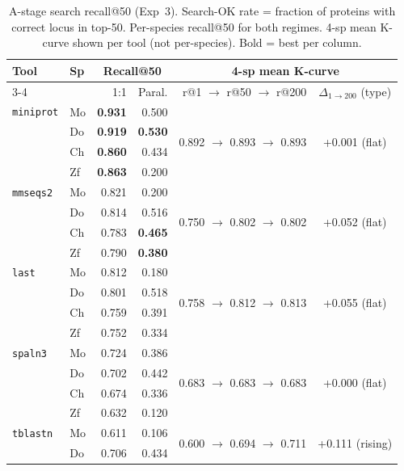 \begin{table}[!t]
\centering
\caption{A-stage search recall@50 (Exp~3). Search-OK rate = fraction of proteins with correct locus in top-50. Per-species recall@50 for both regimes. 4-sp mean K-curve shown per tool (not per-species). Bold = best per column.}
\label{tab:s_exp3_recall}
\footnotesize
\setlength{\tabcolsep}{2.5pt}
\begin{tabular}{llrrrc}
\toprule
Tool & Sp & \multicolumn{2}{c}{Recall@50} & \multicolumn{2}{c}{4-sp mean K-curve} \\
\cmidrule{3-4} \cmidrule{5-6}
 & & 1:1 & Paral. & r@1 $\rightarrow$ r@50 $\rightarrow$ r@200 & $\Delta_{1\to200}$ (type) \\
\midrule
\texttt{miniprot} & Mo & \textbf{0.931} & 0.500 & \multirow{4}{*}{0.892 $\rightarrow$ 0.893 $\rightarrow$ 0.893} & \multirow{4}{*}{+0.001 (flat)} \\
 & Do & \textbf{0.919} & \textbf{0.530} & & \\
 & Ch & \textbf{0.860} & 0.434 & & \\
 & Zf & \textbf{0.863} & 0.200 & & \\
\midrule
\texttt{mmseqs2} & Mo & 0.821 & 0.200 & \multirow{4}{*}{0.750 $\rightarrow$ 0.802 $\rightarrow$ 0.802} & \multirow{4}{*}{+0.052 (flat)} \\
 & Do & 0.814 & 0.516 & & \\
 & Ch & 0.783 & \textbf{0.465} & & \\
 & Zf & 0.790 & \textbf{0.380} & & \\
\midrule
\texttt{last} & Mo & 0.812 & 0.180 & \multirow{4}{*}{0.758 $\rightarrow$ 0.812 $\rightarrow$ 0.813} & \multirow{4}{*}{+0.055 (flat)} \\
 & Do & 0.801 & 0.518 & & \\
 & Ch & 0.759 & 0.391 & & \\
 & Zf & 0.752 & 0.334 & & \\
\midrule
\texttt{spaln3} & Mo & 0.724 & 0.386 & \multirow{4}{*}{0.683 $\rightarrow$ 0.683 $\rightarrow$ 0.683} & \multirow{4}{*}{+0.000 (flat)} \\
 & Do & 0.702 & 0.442 & & \\
 & Ch & 0.674 & 0.336 & & \\
 & Zf & 0.632 & 0.120 & & \\
\midrule
\texttt{tblastn} & Mo & 0.611 & 0.106 & \multirow{4}{*}{0.600 $\rightarrow$ 0.694 $\rightarrow$ 0.711} & \multirow{4}{*}{+0.111 (rising)} \\
 & Do & 0.706 & 0.434 & & \\

\end{tabular}
\end{table}
